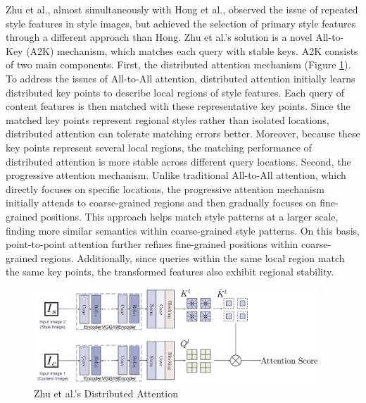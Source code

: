 \documentclass[preprint,12pt]{elsarticle}
\begin{document}
Zhu et al.\citep{55zhu2023all}, almost simultaneously with Hong et al.\citep{54hong2023aespa}, observed the issue of repeated style features in style images, but achieved the selection of primary style features through a different approach than Hong\citep{54hong2023aespa}. Zhu et al.'s solution is a novel All-to-Key (A2K) mechanism, which matches each query with stable keys. A2K consists of two main components. First, the distributed attention mechanism (Figure \ref{fig9_Zhu}). To address the issues of All-to-All attention, distributed attention initially learns distributed key points to describe local regions of style features. Each query of content features is then matched with these representative key points. Since the matched key points represent regional styles rather than isolated locations, distributed attention can tolerate matching errors better. Moreover, because these key points represent several local regions, the matching performance of distributed attention is more stable across different query locations. Second, the progressive attention mechanism. Unlike traditional All-to-All attention, which directly focuses on specific locations, the progressive attention mechanism initially attends to coarse-grained regions and then gradually focuses on fine-grained positions. This approach helps match style patterns at a larger scale, finding more similar semantics within coarse-grained style patterns. On this basis, point-to-point attention further refines fine-grained positions within coarse-grained regions. Additionally, since queries within the same local region match the same key points, the transformed features also exhibit regional stability.

\begin{figure}[!htbp]%
    \centering%
    \includegraphics[width=0.95\textwidth]{Figure_10__Zhu_et_al_Distributed_Attention.pdf}
    \caption{Zhu et al.'s Distributed Attention\citep{55zhu2023all}}\label{fig9_Zhu}
\end{figure}
\end{document}
